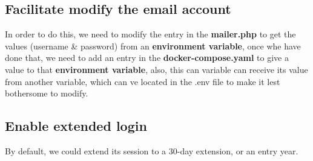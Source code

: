 \subsection[Facilitate modify the email account]{Facilitate modify the email account}\label{subsec:facilitate-modify-the-email-account2}
\begin{flushleft}
In order to do this, we need to modify the entry in the \textbf{mailer.php} to get the values (username \& password)
from an \textbf{environment variable}, once whe have done that, we need to add an entry in the \textbf{docker-compose.yaml}
to give a value to that \textbf{environment variable}, also, this can variable can receive its value from another variable,
which can ve located in the .env file to make it lest bothersome to modify.
\end{flushleft}

\newpage

\subsection[Enable extended login]{Enable extended login}\label{subsec:enable-extended-login}
\begin{flushleft}
    By default, we could extend its session to a 30-day extension, or an entry year.
\end{flushleft}

